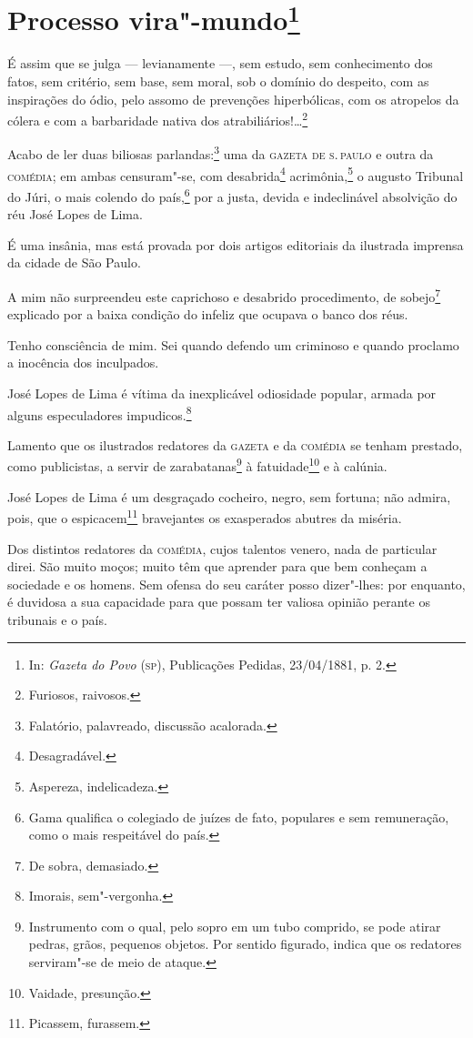\chapter{Processo vira"-mundo\footnote[*]{In: \emph{Gazeta do Povo}
  (\textsc{sp}), Publicações Pedidas, 23/04/1881, p. 2.}}

É assim que se julga --- levianamente ---, sem estudo, sem
conhecimento dos fatos, sem critério, sem base, sem moral, sob o domínio
do despeito, com as inspirações do ódio, pelo assomo de prevenções
hiperbólicas, com os atropelos da cólera e com a barbaridade nativa dos
atrabiliários!\ldots{}\footnote{Furiosos, raivosos.}

Acabo de ler duas biliosas parlandas:\footnote{Falatório, palavreado,
  discussão acalorada.} uma da \textsc{gazeta de s.\,paulo} e outra da
\textsc{comédia}; em ambas censuram"-se, com desabrida\footnote{
  Desagradável.} acrimônia,\footnote{Aspereza, indelicadeza.} o
augusto Tribunal do Júri, o mais colendo do país,\footnote{Gama
  qualifica o colegiado de juízes de fato, populares e sem remuneração,
  como o mais respeitável do país.} por a justa, devida e indeclinável
absolvição do réu José Lopes de Lima.

É uma insânia, mas está provada por dois artigos editoriais da ilustrada
imprensa da cidade de São Paulo.

A mim não surpreendeu este caprichoso e desabrido procedimento, de
sobejo\footnote{De sobra, demasiado.} explicado por a baixa condição
do infeliz que ocupava o banco dos réus.

Tenho consciência de mim. Sei quando defendo um criminoso e quando
proclamo a inocência dos inculpados.

José Lopes de Lima é vítima da inexplicável odiosidade popular, armada
por alguns especuladores impudicos.\footnote{Imorais, sem"-vergonha.}

Lamento que os ilustrados redatores da \textsc{gazeta} e da \textsc{comédia}
se tenham prestado, como publicistas, a servir de zarabatanas\footnote{
  Instrumento com o qual, pelo sopro em um tubo comprido, se pode atirar
  pedras, grãos, pequenos objetos. Por sentido figurado, indica que os
  redatores serviram"-se de meio de ataque.} à fatuidade\footnote{
  Vaidade, presunção.} e à calúnia.

José Lopes de Lima é um desgraçado cocheiro, negro, sem fortuna; não
admira, pois, que o espicacem\footnote{Picassem, furassem.}
bravejantes os exasperados abutres da miséria.

Dos distintos redatores da \textsc{comédia}, cujos talentos venero, nada
de particular direi. São muito moços; muito têm que aprender para que
bem conheçam a sociedade e os homens. Sem ofensa do seu caráter posso
dizer"-lhes: por enquanto, é duvidosa a sua capacidade para que possam
ter valiosa opinião perante os tribunais e o país.

